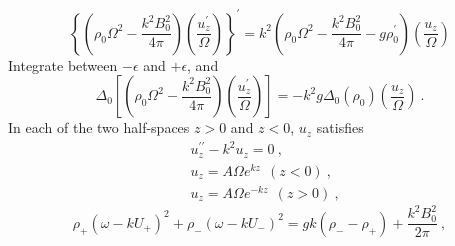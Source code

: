 \documentclass[12pt,a4paper]{article}
\begin{document}
\begin{equation}
\left\{\left(\rho_0 \Omega^2 -\dfrac{k^2 B_0^2}{4\pi} \right) \left(\dfrac{u_z^\prime}{\Omega} \right) \right\}^\prime = k^2 \left(\rho_0 \Omega^2 -\dfrac{k^2 B_0^2}{4\pi} -g \rho_0^\prime \right) \left(\dfrac{u_z}{\Omega} \right) 
\end{equation}
Integrate between $-\epsilon$ and $+\epsilon$, and
\begin{equation}
\Delta_0 \left[\left(\rho_0 \Omega^2 -\dfrac{k^2 B_0^2}{4\pi} \right) \left(\dfrac{u_z^\prime}{\Omega} \right) \right] = -k^2 g \Delta_0 (\rho_0) \left(\dfrac{u_z}{\Omega} \right) ~.
\end{equation}
In each of the two half-spaces $z > 0$ and $z < 0$, $u_z$ satisfies
\begin{align*}
& u^{\prime\prime}_z -k^2 u_z = 0 ~, \\
& u_z = A \Omega e^{kz} ~~(z < 0) ~, \\
& u_z = A \Omega e^{-kz} ~~(z > 0) ~, 
\end{align*}
\begin{equation*}
\rho_+(\omega -kU_+)^2 +\rho_- (\omega -kU_-)^2 = g k(\rho_- -\rho_+)  + \dfrac{k^2 B_0^2}{2\pi} ~,
\end{equation*}
\end{document}
